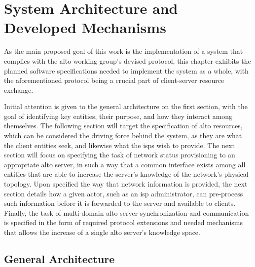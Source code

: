 \chapter{System Architecture and Developed Mechanisms}

    As the main proposed goal of this work is the implementation of a system that complies with the \gls{alto} working group's devised protocol, this chapter exhibits the planned software specifications needed to implement the system as a whole, with the aforementioned protocol being a crucial part of client-server resource exchange.

    Initial attention is given to the general architecture on the first section, with the goal of identifying key entities, their purpose, and how they interact among themselves.
    The following section will target the specification of \gls{alto} resources, which can be considered the driving force behind the system, as they are what the client entities seek, and likewise what the \glspl{isp} wish to provide.
    The next section will focus on specifying the task of network status provisioning to an appropriate \gls{alto} server, in such a way that a common interface exists among all entities that are able to increase the server's knowledge of the network's physical topology.
    Upon specified the way that network information is provided, the next section details how a given actor, such as an \gls{isp} administrator, can pre-process such information before it is forwarded to the server and available to clients.
    Finally, the task of multi-domain \gls{alto} server synchronization and communication is specified in the form of required protocol extensions and needed mechanisms that allows the increase of a single \gls{alto} server's knowledge space.

\section{General Architecture}

